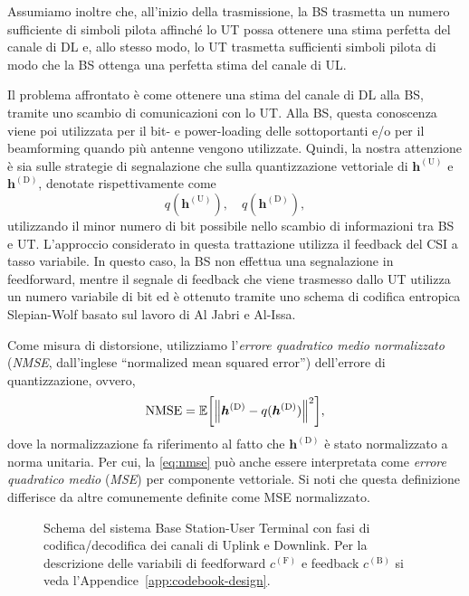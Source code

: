 Assumiamo inoltre che, all'inizio della trasmissione, la BS trasmetta un numero
sufficiente di simboli pilota affinché lo UT possa ottenere una stima perfetta
del canale di DL e, allo stesso modo, lo UT trasmetta sufficienti simboli
pilota di modo che la BS ottenga una perfetta stima del canale di UL.

Il problema affrontato è come ottenere una stima del canale di DL alla BS,
tramite uno scambio di comunicazioni con lo UT. Alla BS, questa conoscenza
viene poi utilizzata per il bit- e power-loading delle sottoportanti e/o per il
beamforming quando più antenne vengono utilizzate. Quindi, la nostra attenzione
è sia sulle strategie di segnalazione che sulla quantizzazione vettoriale di
\(\bm{h}^\mathrm{(U)}\) e \(\bm{h}^\mathrm{(D)}\), denotate rispettivamente
come
\begin{equation}
    q(\bm{h}^\mathrm{(U)}), \quad q(\bm{h}^\mathrm{(D)}),
\end{equation}
utilizzando il minor numero di bit possibile nello scambio di informazioni tra
BS e UT. L'approccio considerato in questa trattazione utilizza il feedback del
CSI a tasso variabile. In questo caso, la BS non effettua una segnalazione in
feedforward, mentre il segnale di feedback che viene trasmesso dallo UT
utilizza un numero variabile di bit ed è ottenuto tramite uno schema di
codifica entropica Slepian-Wolf basato sul lavoro di Al Jabri e
Al-Issa.\cite{10.1007/BFb0024445}

Come misura di distorsione, utilizziamo l'\textit{errore quadratico medio
normalizzato} (\textit{NMSE}, dall'inglese ``normalized mean squared error'')
dell'errore di quantizzazione, ovvero,
\begin{equation} \label{eq:nmse}
    \mathrm{NMSE} = \expect{
        \lnorm \bm{h}^\mathrm{(D)} - q(\bm{h}^\mathrm{(D)}) \rnorm^2
    },
\end{equation}
dove la normalizzazione fa riferimento al fatto che \(\bm{h}^\mathrm{(D)}\) è
stato normalizzato a norma unitaria. Per cui, la \eqref{eq:nmse} può anche
essere interpretata come \textit{errore quadratico medio} (\textit{MSE}) per
componente vettoriale. Si noti che questa definizione differisce da altre
comunemente definite come MSE normalizzato.

\begin{figure}[ht]
    \centering
    
    \caption{
        Schema del sistema Base Station-User Terminal con fasi di
        codifica/decodifica dei canali di Uplink e Downlink. Per la descrizione
        delle variabili di feedforward \(c^\mathrm{(F)}\) e feedback
        \(c^\mathrm{(B)}\) si veda l'Appendice~\ref{app:codebook-design}.
    }
    \label{fig:complete-schema}
\end{figure}
